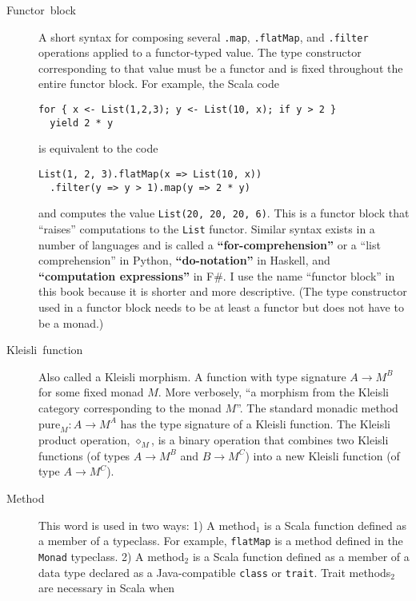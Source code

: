 \begin{description}
\item [{Functor~block}] A short syntax for composing
several \lstinline!.map!, \lstinline!.flatMap!, and \lstinline!.filter!
operations applied to a functor-typed value. The type constructor
corresponding to that value must be a functor and is fixed throughout
the entire functor block. For example, the Scala code
\begin{lstlisting}
for { x <- List(1,2,3); y <- List(10, x); if y > 2 }
  yield 2 * y
\end{lstlisting}
is equivalent to the code
\begin{lstlisting}
List(1, 2, 3).flatMap(x => List(10, x))
  .filter(y => y > 1).map(y => 2 * y)
\end{lstlisting}
and computes the value \lstinline!List(20, 20, 20, 6)!. This is a
functor block that ``raises'' computations to the \lstinline!List!
functor. Similar syntax exists in a number of languages and is called
a \textbf{``for-comprehension''}
or a ``list comprehension'' in Python, \textbf{``do-notation''}
in Haskell, and \textbf{``computation expressions''}
in F\#. I use the name ``functor block'' in this book because it
is shorter and more descriptive. (The type constructor used in a functor
block needs to be at least a functor but does not have to be a monad.)
\item [{Kleisli~function}] Also called a Kleisli
morphism. A function with type signature
$A\rightarrow M^{B}$ for some fixed monad $M$. More verbosely, ``a
morphism from the Kleisli category corresponding to the monad $M$''.
The standard monadic method $\text{pure}_{M}:A\rightarrow M^{A}$
has the type signature of a Kleisli function. The Kleisli product
operation, $\diamond_{M}$, is a binary operation that combines two
Kleisli functions (of types $A\rightarrow M^{B}$ and $B\rightarrow M^{C}$)
into a new Kleisli function (of type $A\rightarrow M^{C}$).
\item [{Method}] This word is used in two ways: 1) A method$_{1}$
is a Scala function defined as a member of a typeclass. For example,
\lstinline!flatMap! is a method defined in the \lstinline!Monad!
typeclass. 2) A method$_{2}$ is a Scala function defined as a member
of a data type declared as a Java-compatible \lstinline!class! or
\lstinline!trait!. Trait methods$_{2}$ are necessary in Scala when

\end{description}
